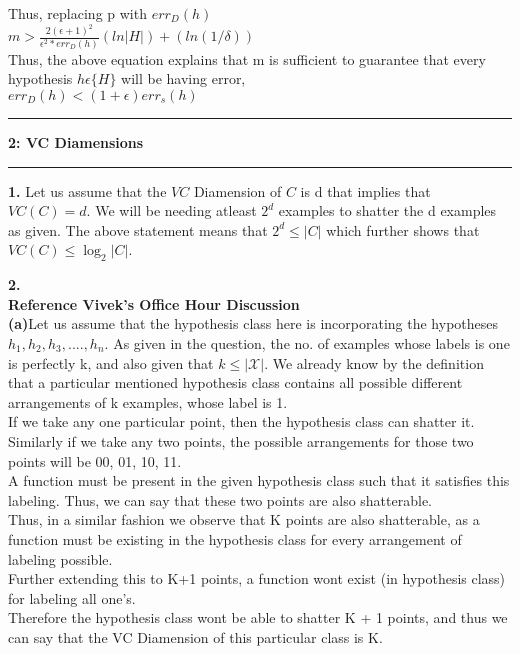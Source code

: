 \documentclass[11pt]{article}
\newcommand\question[2]{\vspace{.25in}\hrule\textbf{#1: #2}\vspace{.5em}\hrule\vspace{.10in}}
\begin{document}
Thus, replacing p with $err_{D}(h)$\\
$m > \frac {2(\epsilon +1)^{2}} {\epsilon^{2}*err_{D}(h) }(ln |H|) + (ln (1/ \delta))$\\[15pt]
Thus, the above equation explains that m is sufficient to guarantee that every hypothesis $h \epsilon \{H\}$ will be having error,\\
$err_{D}(h) < (1 + \epsilon )err_{s} (h)$\\ 


\question{2}{VC Diamensions}
{\bf 1.} Let us assume that the $VC$ Diamension of $C$ is d that implies that $VC(C)=d$. We will be needing atleast $2^{d}$ examples to shatter the d examples as given. The above statement means that $2^{d} \leq |C|$ which further shows that $VC(C) \leq \log_{2}|C|$.

{\bf 2.}\\ {\bf Reference Vivek's Office Hour Discussion}\\
{\bf (a)}Let us assume that the hypothesis class here is incorporating the hypotheses $h_1,h_2,h_3,....,h_n$. As given in the question, the no. of examples whose labels is one is perfectly k, and also given that $k\leq |\mathcal X|$. We already know by the definition that a particular mentioned hypothesis class contains all possible different arrangements of k examples, whose label is 1.\\
If we take any one particular point, then the hypothesis class can shatter it.\\
Similarly if we take any two points, the possible arrangements for those two points will be 00, 01, 10, 11.\\
A function must be present in the given hypothesis class such that it satisfies this labeling. Thus, we can say that these two points are also shatterable.\\
Thus, in a similar fashion we observe that K points are also shatterable, as a function must be existing in the hypothesis class for every arrangement of labeling possible.\\
Further extending this to K+1 points, a function wont exist (in hypothesis class) for labeling all one's.\\
Therefore the hypothesis class wont be able to shatter K + 1 points, and thus we can say that the VC Diamension of this particular class is K.\\[10pt]
\end{document}
